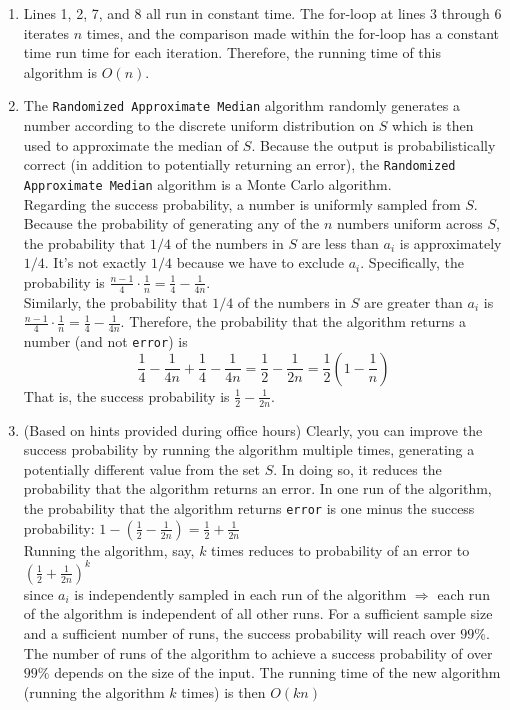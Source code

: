 \documentclass[twoside,11pt]{homework}
\begin{document}
\begin{enumerate}[\bf (a)]

\item  Lines 1, 2, 7, and 8 all run in constant time.  The for-loop at lines 3 through 6 iterates $n$ times, and the comparison made within the for-loop has a constant time run time for each iteration.  Therefore, the running time of this algorithm is $O(n)$.


\item The \texttt{Randomized Approximate Median} algorithm randomly generates a number according to the discrete uniform distribution on $S$  which is then used to approximate the median of $S$.  Because the output is probabilistically correct (in addition to potentially returning an error), the \texttt{Randomized Approximate Median} algorithm is a Monte Carlo algorithm.  \\[0.5em]
Regarding the success probability,  a number is uniformly sampled from $S$.  Because the probability of generating any of the $n$ numbers uniform across $S$, the probability that $1/4$ of the numbers in $S$ are less than $a_i$ is approximately $1/4$. It's not exactly $1/4$ because we have to exclude $a_i$.  Specifically, the probability is $\frac{n-1}{4} \cdot \frac{1}{n} = \frac{1}{4} - \frac{1}{4n}$. \\[0.3em]
Similarly, the probability that $1/4$ of the numbers in $S$ are greater than $a_i$ is \\[0.2em]
$\frac{n-1}{4} \cdot \frac{1}{n} = \frac{1}{4} - \frac{1}{4n}$. Therefore, the probability that the algorithm returns a number (and not \texttt{error}) is $$\frac{1}{4} - \frac{1}{4n} + \frac{1}{4} - \frac{1}{4n} = \frac{1}{2} - \frac{1}{2n} = \frac{1}{2}\left(1 - \frac{1}{n}\right)$$
That is, the success probability is $ \frac{1}{2} - \frac{1}{2n}$.
\item (Based on hints provided during office hours) Clearly, you can improve the success probability by running the algorithm multiple times, generating a potentially different value from the set $S$.  In doing so, it reduces the probability that the algorithm returns an error.  In one run of the algorithm, the probability that the algorithm returns 
\texttt{error} is one minus the success probability:  $1 - \left(\frac{1}{2} - \frac{1}{2n}\right) = \frac{1}{2} + \frac{1}{2n}$ \\[0.3em]
Running the algorithm, say, $k$ times reduces to probability of an error to $\left( \frac{1}{2} + \frac{1}{2n} \right)^k$  \\[0.3em]
since $a_i$ is independently sampled in each run of the algorithm $\Longrightarrow$ each run of the algorithm is independent of all other runs.  For a sufficient sample size and a sufficient number of runs, the success probability will reach over $99\%$.  The number of runs of the algorithm to achieve a success probability of over $99\%$ depends on the size of the input.  
The running time of the new algorithm (running the algorithm $k$ times) is then $O(kn)$

\end{enumerate}
\end{document}
